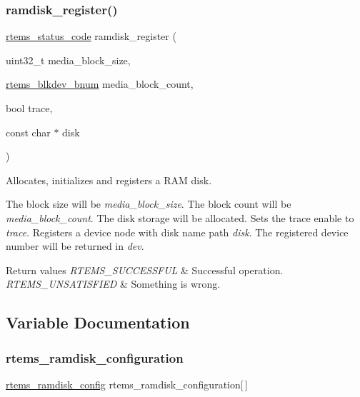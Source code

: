 \subsubsection{\texorpdfstring{ramdisk\_register()}{ramdisk\_register()}}
{\footnotesize\ttfamily \mbox{\hyperlink{group__ClassicStatus_ga545d41846817eaba6143d52ee4d9e9fe}{rtems\+\_\+status\+\_\+code}} ramdisk\+\_\+register (\begin{DoxyParamCaption}\item[{uint32\+\_\+t}]{media\+\_\+block\+\_\+size,  }\item[{\mbox{\hyperlink{group__rtems__disk_ga5fbcfd40b657bff6c54d9e393fab3274}{rtems\+\_\+blkdev\+\_\+bnum}}}]{media\+\_\+block\+\_\+count,  }\item[{bool}]{trace,  }\item[{const char $\ast$}]{disk }\end{DoxyParamCaption})}



Allocates, initializes and registers a R\+AM disk. 

The block size will be {\itshape media\+\_\+block\+\_\+size}. The block count will be {\itshape media\+\_\+block\+\_\+count}. The disk storage will be allocated. Sets the trace enable to {\itshape trace}. Registers a device node with disk name path {\itshape disk}. The registered device number will be returned in {\itshape dev}.


\begin{DoxyRetVals}{Return values}
{\em R\+T\+E\+M\+S\+\_\+\+S\+U\+C\+C\+E\+S\+S\+F\+UL} & Successful operation. \\
\hline
{\em R\+T\+E\+M\+S\+\_\+\+U\+N\+S\+A\+T\+I\+S\+F\+I\+ED} & Something is wrong. \\
\hline
\end{DoxyRetVals}


\subsection{Variable Documentation}
\mbox{\label{group__rtems__ramdisk_ga3f3e285d9218984555c395ae54250e1e}} 
\subsubsection{\texorpdfstring{rtems\_ramdisk\_configuration}{rtems\_ramdisk\_configuration}}
{\footnotesize\ttfamily \mbox{\hyperlink{structrtems__ramdisk__config}{rtems\+\_\+ramdisk\+\_\+config}} rtems\+\_\+ramdisk\+\_\+configuration\mbox{[}$\,$\mbox{]}}




